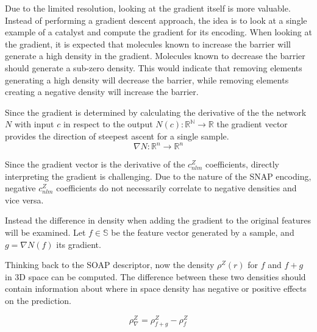 Due to the limited resolution, looking at the gradient itself is more valuable.
Instead of performing a gradient descent approach, the idea is to look at a single example of a catalyst and compute the gradient for its encoding.
When looking at the gradient, it is expected that molecules known to increase the barrier will generate a high density in the gradient.
Molecules known to decrease the barrier should generate a sub-zero density.
This would indicate that removing elements generating a high density will decrease the barrier,
while removing elements creating a negative density will increase the barrier. %

Since the gradient is determined by calculating the derivative of the the network $N$ with input $c$ in respect to the output $N(c): \mathbb{R^N} \to \mathbb{R}$
the gradient vector provides the direction of steepest ascent for a single sample.
$$
\nabla N: \mathbb{R}^n  \to \mathbb{R}^n 
$$

Since the gradient vector is the derivative of the $c_{nlm}^Z$ coefficients, 
directly interpreting the gradient is challenging. 
Due to the nature of the SNAP encoding, negative $c_{nlm}^Z$ coefficients do not necessarily correlate to negative densities and vice versa.

Instead the difference in density when adding the gradient to the original features will be examined.
Let $f \in \mathbb{S}$ be the feature vector generated by a sample, and $g = \nabla N(f)$ its gradient.

Thinking back to the SOAP descriptor, now the density $\rho^Z(r)$ for $f$ and $f + g$ in 3D space can be computed.
The difference between these two densities should contain information about where in space density has negative or positive effects on the prediction.

$$ \rho^Z_\nabla = \rho^Z_{f+g} -  \rho^Z_{f} $$

